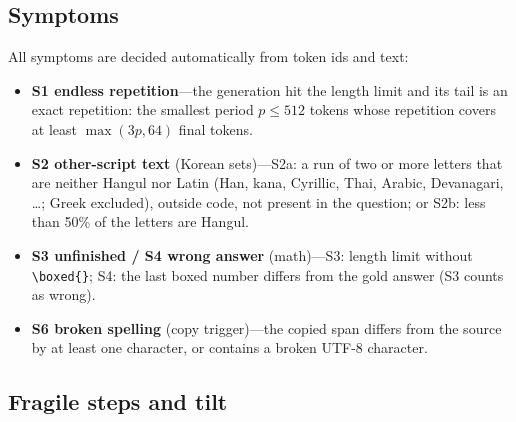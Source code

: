 \documentclass[11pt]{article}
\begin{document}
\subsection{Symptoms}\label{sec:symptoms}

All symptoms are decided automatically from token ids and text:
\begin{itemize}
\item \textbf{S1 endless repetition}---the generation hit the length limit and its tail is an exact repetition: the
      smallest period $p\le 512$ tokens whose repetition covers at least $\max(3p, 64)$ final tokens.
\item \textbf{S2 other-script text} (Korean sets)---S2a: a run of two or more letters that are neither Hangul nor Latin
      (Han, kana, Cyrillic, Thai, Arabic, Devanagari, \dots; Greek excluded), outside code, not present in the question;
      or S2b: less than 50\% of the letters are Hangul.
\item \textbf{S3 unfinished / S4 wrong answer} (math)---S3: length limit without \texttt{\textbackslash boxed\{\}}; S4: the
      last boxed number differs from the gold answer (S3 counts as wrong).
\item \textbf{S6 broken spelling} (copy trigger)---the copied span differs from the source by at least one character, or
      contains a broken UTF-8 character.
\end{itemize}

\subsection{Fragile steps and tilt}\label{sec:tilt}
\end{document}
